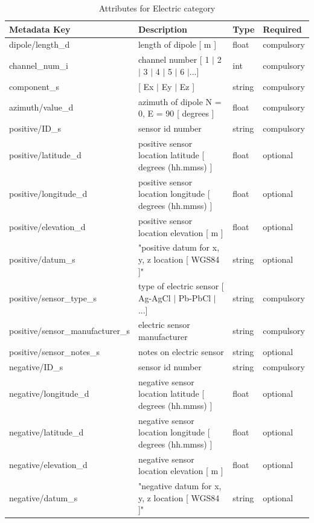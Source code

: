 \documentclass{article}
\begin{document}
\begin{table}[htb!]
	\caption[Attributes for Electric Channel]{Attributes for Electric category}
	\begin{tabular}{|l|p{3in}|l|l|}
		\hline
		\textbf{Metadata Key} & \textbf{Description} & \textbf{Type} & \textbf{Required} \\ \hline
		dipole/length\_d & length of dipole [ m ] & float & compulsory \\ \hline
		channel\_num\_i & channel number [ 1 $|$ 2 $|$ 3 $|$ 4 $|$ 5 $|$ 6 $|$...] & int & compulsory \\ \hline
		component\_s & [ Ex $|$ Ey $|$ Ez ] & string  & compulsory \\ \hline
		azimuth/value\_d & azimuth of dipole N = 0,  E = 90 [ degrees ] & float & compulsory \\ \hline
		positive/ID\_s & sensor id number & string & compulsory \\ \hline
		positive/latitude\_d & positive sensor location latitude [ degrees (hh.mmss) ] & float & optional \\ \hline
		positive/longitude\_d & positive sensor location longitude [ degrees (hh.mmss) ] & float & optional \\ \hline
		positive/elevation\_d & positive sensor location elevation [ m ] & float & optional \\ \hline
		positive/datum\_s & "positive datum for x, y, z location [ WGS84 ]" & string & optional \\ \hline
		positive/sensor\_type\_s & type of electric sensor [ Ag-AgCl $|$ Pb-PbCl $|$ ...] & string & compulsory \\ \hline
		positive/sensor\_manufacturer\_s & electric sensor manufacturer & string & compulsory \\ \hline
		positive/sensor\_notes\_s & notes on electric sensor & string & optional \\ \hline
		negative/ID\_s & sensor id number & string & compulsory \\ \hline
		negative/longitude\_d & negative sensor location latitude [ degrees (hh.mmss) ] & float & optional \\ \hline
		negative/latitude\_d & negative sensor location longitude [ degrees (hh.mmss) ] & float & optional \\ \hline
		negative/elevation\_d & negative sensor location elevation [ m ] & float & optional \\ \hline
		negative/datum\_s & "negative datum for x, y, z location [ WGS84 ]" & string & optional \\ \hline

\end{tabular}
\end{table}
\end{document}

